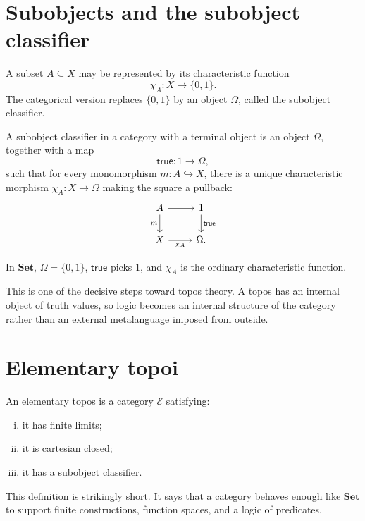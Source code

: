 \section{Subobjects and the subobject classifier}

A subset \(A\subseteq X\) may be represented by its characteristic function
\[
  \chi_A:X\to\{0,1\}.
\]
The categorical version replaces \(\{0,1\}\) by an object \(\Omega\), called the subobject classifier.

\begin{definition}
A subobject classifier in a category with a terminal object is an object \(\Omega\), together with a map
\[
  \mathsf{true}:1\to\Omega,
\]
such that for every monomorphism \(m:A\hookrightarrow X\), there is a unique characteristic morphism \(\chi_A:X\to\Omega\) making the square a pullback:
\[
\begin{tikzcd}
A \arrow[r] \arrow[d,swap,"m"] & 1 \arrow[d,"\mathsf{true}"]\\
X \arrow[r,swap,"\chi_A"] & \Omega.
\end{tikzcd}
\]
\end{definition}

In \(\mathbf{Set}\), \(\Omega=\{0,1\}\), \(\mathsf{true}\) picks \(1\), and \(\chi_A\) is the ordinary characteristic function.

\begin{remark}
This is one of the decisive steps toward topos theory.  A topos has an internal object of truth values, so logic becomes an internal structure of the category rather than an external metalanguage imposed from outside.
\end{remark}

\section{Elementary topoi}

\begin{definition}
An elementary topos is a category \(\mathcal E\) satisfying:
\begin{enumerate}[(i)]
  \item it has finite limits;
  \item it is cartesian closed;
  \item it has a subobject classifier.
\end{enumerate}
\end{definition}

This definition is strikingly short.  It says that a category behaves enough like \(\mathbf{Set}\) to support finite constructions, function spaces, and a logic of predicates.

